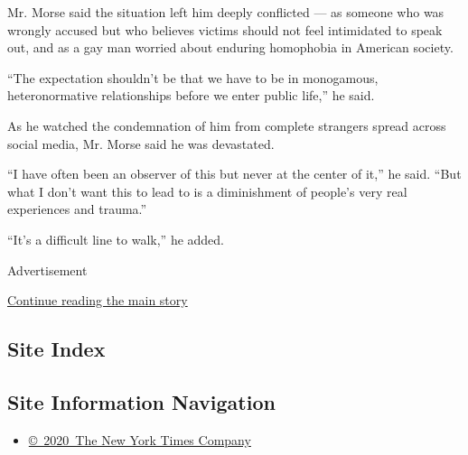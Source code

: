 Mr. Morse said the situation left him deeply conflicted --- as someone
who was wrongly accused but who believes victims should not feel
intimidated to speak out, and as a gay man worried about enduring
homophobia in American society.

``The expectation shouldn't be that we have to be in monogamous,
heteronormative relationships before we enter public life,'' he said.

As he watched the condemnation of him from complete strangers spread
across social media, Mr. Morse said he was devastated.

``I have often been an observer of this but never at the center of it,''
he said. ``But what I don't want this to lead to is a diminishment of
people's very real experiences and trauma.''

``It's a difficult line to walk,'' he added.

Advertisement

\protect\hyperlink{after-bottom}{Continue reading the main story}

\hypertarget{site-index}{%
\subsection{Site Index}\label{site-index}}

\hypertarget{site-information-navigation}{%
\subsection{Site Information
Navigation}\label{site-information-navigation}}

\begin{itemize}
\tightlist
\item
  \href{https://help.nytimes3xbfgragh.onion/hc/en-us/articles/115014792127-Copyright-notice}{©~2020~The
  New York Times Company}
\end{itemize}

